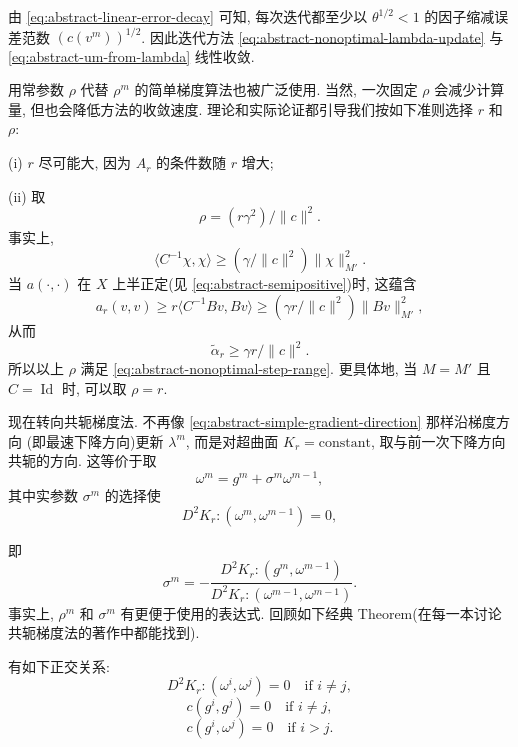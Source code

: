 \setcounter{statement}{6}
\begin{Remark}\label{rem:abstract-linear-convergence-rate}
由 
\eqref{eq:abstract-linear-error-decay} 可知, 每次迭代都至少以
$\theta^{1/2}<1$ 的因子缩减误差范数 $(c(v^m))^{1/2}$.
因此迭代方法
\eqref{eq:abstract-nonoptimal-lambda-update} 与
\eqref{eq:abstract-um-from-lambda} 线性收敛.
\end{Remark}

\setcounter{statement}{7}
\begin{Remark}\label{rem:abstract-constant-gradient-step}
用常参数 $\rho$ 代替 $\rho^m$ 的简单梯度算法也被广泛使用.
当然, 一次固定 $\rho$ 会减少计算量, 但也会降低方法的收敛速度.
理论和实际论证都引导我们按如下准则选择 $r$ 和 $\rho$:

\textup{(i)} $r$ 尽可能大, 因为 $A_r$ 的条件数随 $r$ 增大;

\textup{(ii)} 取
\[
\rho=(r\gamma^2)/\|c\|^2.
\]
事实上,
\[
\langle C^{-1}\chi,\chi\rangle
\ge(\gamma/\|c\|^2)\|\chi\|_{M'}^2.
\]
当 $a(\cdot,\cdot)$ 在 $X$ 上半正定(见
\eqref{eq:abstract-semipositive})时, 这蕴含
\[
a_r(v,v)\ge r\langle C^{-1}Bv,Bv\rangle
\ge(\gamma r/\|c\|^2)\|Bv\|_{M'}^2,
\]
从而
\[
\widetilde\alpha_r\ge\gamma r/\|c\|^2.
\]
所以以上 $\rho$ 满足 
\eqref{eq:abstract-nonoptimal-step-range}.
更具体地, 当 $M=M'$ 且 $C=\operatorname{Id}$ 时, 可以取 $\rho=r$.
\end{Remark}

现在转向共轭梯度法. 不再像 
\eqref{eq:abstract-simple-gradient-direction} 那样沿梯度方向
(即最速下降方向)更新 $\lambda^m$, 而是对超曲面
$K_r=\text{constant}$, 取与前一次下降方向共轭的方向. 这等价于取
\begin{equation}\label{eq:abstract-conjugate-direction}
\omega^m=g^m+\sigma^m\omega^{m-1},
\end{equation}
其中实参数 $\sigma^m$ 的选择使
\[
D^2K_r\mathbin{:}(\omega^m,\omega^{m-1})=0,
\]

即
\begin{equation}\label{eq:abstract-conjugate-sigma-definition}
\sigma^m=-\frac{D^2K_r\mathbin{:}(g^m,\omega^{m-1})}
{D^2K_r\mathbin{:}(\omega^{m-1},\omega^{m-1})}.
\end{equation}
事实上, $\rho^m$ 和 $\sigma^m$ 有更便于使用的表达式.
回顾如下经典 Theorem(在每一本讨论共轭梯度法的著作中都能找到).

\setcounter{statement}{7}
\begin{Theorem}\label{thm:abstract-conjugate-orthogonality}
有如下正交关系:
\[
D^2K_r\mathbin{:}(\omega^i,\omega^j)=0
\quad\text{if }i\ne j,
\]
\[
c(g^i,g^j)=0
\quad\text{if }i\ne j,
\]
\[
c(g^i,\omega^j)=0
\quad\text{if }i>j.
\]
\end{Theorem}

